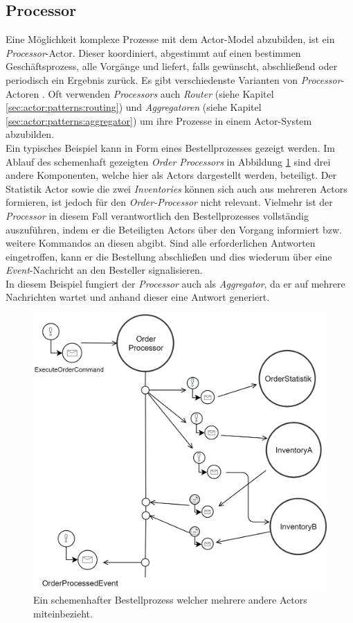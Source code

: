\subsection{Processor}\label{sub:actor:patterns:processor}
Eine Möglichkeit komplexe Prozesse mit dem Actor-Model abzubilden, ist ein \textit{Processor}-Actor. Dieser koordiniert, abgestimmt auf einen bestimmen Geschäftsprozess, alle Vorgänge und liefert, falls gewünscht, abschließend oder periodisch ein Ergebnis zurück. Es gibt verschiedenste Varianten von \textit{Processor}-Actoren \citep{Vernon2015ReactiveAkka}.
Oft verwenden \textit{Processors} auch \textit{Router} (siehe Kapitel \ref{sec:actor:patterns:routing}) und \textit{Aggregatoren} (siehe Kapitel \ref{sec:actor:patterns:aggregator}) um ihre Prozesse in einem Actor-System abzubilden. \\
Ein typisches Beispiel kann in Form eines Bestellprozesses gezeigt werden. Im Ablauf des schemenhaft gezeigten \textit{Order Processors} in Abbildung \ref{fig:actor:patterns:orderProcesseor} sind drei andere Komponenten, welche hier als Actors dargestellt werden, beteiligt. Der Statistik Actor sowie die zwei \textit{Inventories} können sich auch aus mehreren Actors formieren, ist jedoch für den \textit{Order-Processor} nicht relevant. Vielmehr ist der \textit{Processor} in diesem Fall verantwortlich den Bestellprozesses vollständig auszuführen, indem er die Beteiligten Actors über den Vorgang informiert bzw. weitere Kommandos an diesen abgibt. Sind alle erforderlichen Antworten eingetroffen, kann er die Bestellung abschließen und dies wiederum über eine \textit{Event}-Nachricht an den Besteller signalisieren. \\
In diesem Beispiel fungiert der \textit{Processor} auch als \textit{Aggregator}, da er auf mehrere Nachrichten wartet und anhand dieser eine Antwort generiert. 

\begin{figure}
    \centering
    \includegraphics[width=0.9\linewidth]{gfx/actor/patterns/simpleOrderProcesor}
    \caption{Ein schemenhafter Bestellprozess welcher mehrere andere Actors miteinbezieht.}
    \label{fig:actor:patterns:orderProcesseor}
\end{figure}

